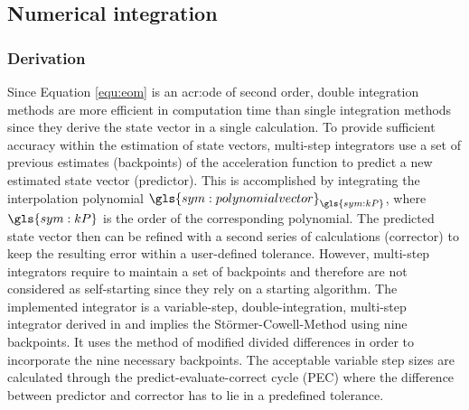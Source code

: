 \subsection{Numerical integration}
\label{sec:propagation-state-integration}

\subsubsection{Derivation}
\label{sec:propagation-state-integration-Derivation}

Since Equation \ref{equ:eom} is an \gls{acr:ode} of second order, double integration methods are more efficient in computation time than single integration methods since they derive
the state vector in a single calculation.
To provide sufficient accuracy within the estimation of state vectors, multi-step integrators use a set of previous estimates (backpoints) of the acceleration function to predict a new 
estimated state vector (predictor). This is accomplished by integrating the interpolation polynomial $\gls{sym:polynomialvector}_{\gls{sym:kP}}$,
where $\gls{sym:kP}$ is the order of the corresponding polynomial. The predicted state vector then can be refined with a second series of calculations (corrector) to keep the
resulting error within a user-defined tolerance. However, multi-step integrators require to maintain a set of backpoints and therefore are not considered as self-starting since they
rely on a starting algorithm. The implemented integrator is a variable-step, double-integration, multi-step integrator derived in \cite{berry2004} and implies the
St\"ormer-Cowell-Method using nine backpoints. It uses the method of modified divided differences in order to incorporate the nine necessary backpoints. The acceptable variable
step sizes are calculated through the predict-evaluate-correct cycle (PEC) where the difference between predictor and corrector has to lie in a predefined tolerance.

